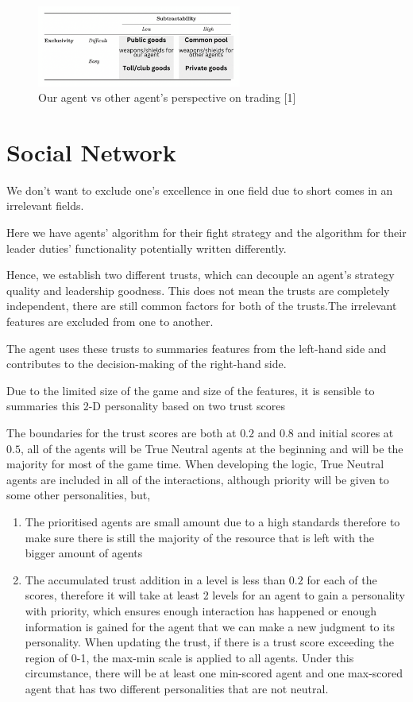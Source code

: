 \begin{figure}[htb]
    \centering
    \includegraphics[width=0.60\textwidth]{008_team_5_agent_design/images/13.png}
    \caption{Our agent vs other agent's perspective on trading [1]}
    \label{13}
\end{figure}


\section{Social Network}

We don't want to exclude one's excellence in one field due to short comes in an irrelevant fields.

Here we have agents' algorithm for their fight strategy and the algorithm for their leader duties' functionality potentially written differently.

Hence, we establish two different trusts, which can decouple an agent's strategy quality and leadership goodness. This does not mean the trusts are completely independent, there are still common factors for both of the trusts.The irrelevant features are excluded from one to another.

The agent uses these trusts to summaries features from the left-hand side and contributes to the decision-making of the right-hand side.

Due to the limited size of the game and size of the features, it is sensible to summaries this 2-D personality based on two trust scores

The boundaries for the trust scores are both at $0.2$ and $0.8$ and initial scores at $0.5$, all of the agents will be True Neutral agents at the beginning and will be the majority for most of the game time. When developing the logic, True Neutral agents are included in all of the interactions, although priority will be given to some other personalities, but,
\begin{enumerate}
    \item The prioritised agents are small amount due to a high standards therefore to make sure there is still the majority of the resource that is left with the bigger amount of agents
    \item The accumulated trust addition in a level is less than $0.2$ for each of the scores, therefore it will take at least 2 levels for an agent to gain a personality with priority, which ensures enough interaction has happened or enough information is gained for the agent that we can make a new judgment to its personality. When updating the trust, if there is a trust score exceeding the region of 0-1, the max-min scale is applied to all agents. Under this circumstance, there will be at least one min-scored agent and one max-scored agent that has two different personalities that are not neutral.
\end{enumerate}

